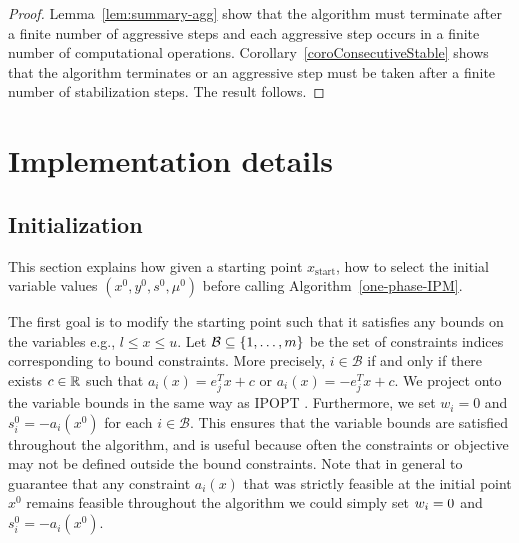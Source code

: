 \documentclass{article}
\begin{document}
\begin{proof}
Lemma~\ref{lem:summary-agg} show that the algorithm must terminate after a finite number of aggressive steps and each aggressive step occurs in a finite number of computational operations.
Corollary~\ref{coroConsecutiveStable} shows that the algorithm terminates or an aggressive step must be taken after a finite number of stabilization steps. The result follows.
\end{proof}



\section{Implementation details}\label{sec:implementation-details}


\subsection{Initialization}\label{sec:initialization}


This section explains how given a starting point $x_{\text{start}}$, how to select the initial variable values $(x^0, y^0, s^0, \mu^0)$ before calling Algorithm~\ref{one-phase-IPM}.

The first goal is to modify the starting point such that it satisfies any bounds on the variables e.g., $l \le x \le u$. Let $\mathcal{B} \subseteq \{ 1, \dots, m \}$ be the set of constraints indices corresponding to bound constraints. More precisely, $i \in \mathcal{B}$ if and only if there exists $c \in \mathbb{R}$ such that $a_i(x) = e_j^T x + c$ or $a_i(x) = -e_j^T x + c$. We project onto the variable bounds in the same way as IPOPT \cite[Section 3.7]{wachter2006implementation}. Furthermore, we set $w_i = 0$ and $s_i^{0} = -a_i(x^0)$ for each $i \in \mathcal{B}$. This ensures that the variable bounds are satisfied throughout the algorithm, and is useful because often the constraints or objective may not be defined outside the bound constraints. Note that in general to guarantee that any constraint $a_i(x)$ that was strictly feasible at the initial point $x^{0}$ remains feasible throughout the algorithm we could simply set $w_i = 0$ and $s_i^{0} = -a_i(x^0)$.
 

\end{document}
